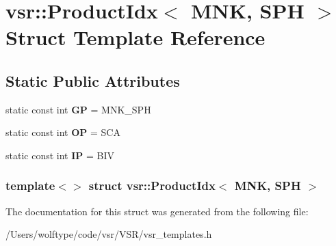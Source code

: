 \hypertarget{structvsr_1_1_product_idx_3_01_m_n_k_00_01_s_p_h_01_4}{\section{vsr\-:\-:Product\-Idx$<$ M\-N\-K, S\-P\-H $>$ Struct Template Reference}
\label{structvsr_1_1_product_idx_3_01_m_n_k_00_01_s_p_h_01_4}
}
\subsection*{Static Public Attributes}
\begin{DoxyCompactItemize}
\item 
\hypertarget{structvsr_1_1_product_idx_3_01_m_n_k_00_01_s_p_h_01_4_ac0fe6baf50a75499be9d1940029b7a5b}{static const int {\bfseries G\-P} = M\-N\-K\-\_\-\-S\-P\-H}\label{structvsr_1_1_product_idx_3_01_m_n_k_00_01_s_p_h_01_4_ac0fe6baf50a75499be9d1940029b7a5b}

\item 
\hypertarget{structvsr_1_1_product_idx_3_01_m_n_k_00_01_s_p_h_01_4_aca0aebdc7f34baa22f8344be59ea1437}{static const int {\bfseries O\-P} = S\-C\-A}\label{structvsr_1_1_product_idx_3_01_m_n_k_00_01_s_p_h_01_4_aca0aebdc7f34baa22f8344be59ea1437}

\item 
\hypertarget{structvsr_1_1_product_idx_3_01_m_n_k_00_01_s_p_h_01_4_aa86b4d6533302afe2f6f7a0d22cb1d73}{static const int {\bfseries I\-P} = B\-I\-V}\label{structvsr_1_1_product_idx_3_01_m_n_k_00_01_s_p_h_01_4_aa86b4d6533302afe2f6f7a0d22cb1d73}

\end{DoxyCompactItemize}
\subsubsection*{template$<$$>$ struct vsr\-::\-Product\-Idx$<$ M\-N\-K, S\-P\-H $>$}



The documentation for this struct was generated from the following file\-:\begin{DoxyCompactItemize}
\item 
/\-Users/wolftype/code/vsr/\-V\-S\-R/vsr\-\_\-templates.\-h\end{DoxyCompactItemize}

